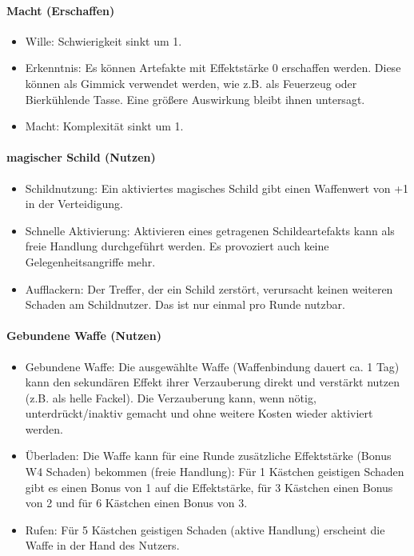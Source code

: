 \documentclass{article}
\begin{document}
\paragraph{Macht (Erschaffen)}

\begin{itemize}
\item Wille: Schwierigkeit sinkt um 1.
\item Erkenntnis: Es können Artefakte mit Effektstärke 0 erschaffen werden. Diese können als Gimmick verwendet werden, wie z.B. als Feuerzeug oder Bierkühlende Tasse. Eine größere Auswirkung bleibt ihnen untersagt.
\item Macht: Komplexität sinkt um 1.
\end{itemize}

\paragraph{magischer Schild (Nutzen)}

\begin{itemize}
\item Schildnutzung: Ein aktiviertes magisches Schild gibt einen Waffenwert von +1 in der Verteidigung.
\item Schnelle Aktivierung: Aktivieren eines getragenen Schildeartefakts kann als freie Handlung durchgeführt werden. Es provoziert auch keine Gelegenheitsangriffe mehr.
\item Aufflackern: Der Treffer, der ein Schild zerstört, verursacht keinen weiteren Schaden am Schildnutzer. Das ist nur einmal pro Runde nutzbar.
\end{itemize}

\paragraph{Gebundene Waffe (Nutzen)}

\begin{itemize}
\item Gebundene Waffe: Die ausgewählte Waffe (Waffenbindung dauert ca. 1 Tag) kann den sekundären Effekt ihrer Verzauberung direkt und verstärkt nutzen (z.B. als helle Fackel). Die Verzauberung kann, wenn nötig, unterdrückt/inaktiv gemacht und ohne weitere Kosten wieder aktiviert werden.
\item Überladen: Die Waffe kann für eine Runde zusätzliche Effektstärke (Bonus W4 Schaden) bekommen (freie Handlung): Für 1 Kästchen geistigen Schaden gibt es einen Bonus von 1 auf die Effektstärke, für 3 Kästchen einen Bonus von 2 und für 6 Kästchen einen Bonus von 3.
\item Rufen: Für 5 Kästchen geistigen Schaden (aktive Handlung) erscheint die Waffe in der Hand des Nutzers.
\end{itemize}
\end{document}
